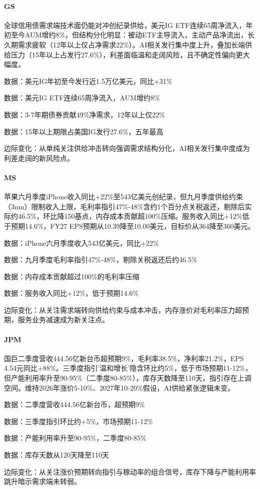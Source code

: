 \documentclass[11pt]{ctexart}
\begin{document}
\paragraph{GS} 全球信用债需求端技术面仍能对冲创纪录供给，美元IG ETF连续65周净流入，年初至今AUM增约8\%，但结构分化明显：被动ETF主导流入，主动产品净流出，长久期需求疲软（12年以上仅占净需求22\%）。AI相关发行集中度上升，叠加长端供给压力（15年以上占发行27.6\%），利差面临温和走阔风险，且不确定性偏向更大幅度。
{\small\color{refgray}数据：美元IG年初至今发行近1.5万亿美元，同比+31\%\par}
{\small\color{refgray}数据：美元IG ETF连续65周净流入，AUM增约8\%\par}
{\small\color{refgray}数据：3-7年期债券贡献49\%净需求，12年以上仅22\%\par}
{\small\color{refgray}数据：15年以上期限占美国IG发行27.6\%，五年最高\par}
{\small\color{refgray}边际变化：从单纯关注供给冲击转向强调需求结构分化，AI相关发行集中度成为利差走阔的新风险点。\par}
\paragraph{MS} 苹果六月季度iPhone收入同比+22\%至543亿美元创纪录，但九月季度供给约束（3nm）限制收入上限，毛利率指引47\%-48\%含约1个百分点关税返还，剔除后实际约46.5\%，环比降150基点，内存成本贡献超100\%压缩。服务收入同比+12\%低于预期14.6\%，FY27 EPS预期从10.39降至10.00美元，目标价从364降至360美元。
{\small\color{refgray}数据：iPhone六月季度收入543亿美元，同比+22\%\par}
{\small\color{refgray}数据：九月季度毛利率指引47\%-48\%，剔除关税返还后约46.5\%\par}
{\small\color{refgray}数据：内存成本贡献超过100\%的毛利率压缩\par}
{\small\color{refgray}数据：服务收入同比+12\%，低于预期14.6\%\par}
{\small\color{refgray}边际变化：从关注需求端转向供给约束与成本冲击，内存涨价对毛利率压力超预期，服务业务减速成为新关注点。\par}
\paragraph{JPM} 国巨二季度营收444.56亿新台币超预期9\%，毛利率38.5\%，净利率21.2\%，EPS 4.54元同比+88\%。三季度指引'温和增长'隐含环比约5\%，低于市场预期11-12\%，但产能利用率升至90-95\%（二季度80-85\%），库存天数降至110天，指引存在上调空间。维持2026年涨价5-10\%、2027年10-20\%假设，AI供给紧张逻辑未变。
{\small\color{refgray}数据：二季度营收444.56亿新台币，超预期9\%\par}
{\small\color{refgray}数据：三季度指引环比约+5\%，市场预期11-12\%\par}
{\small\color{refgray}数据：产能利用率升至90-95\%，二季度80-85\%\par}
{\small\color{refgray}数据：库存天数从120天降至110天\par}
{\small\color{refgray}边际变化：从关注涨价预期转向指引与稼动率的组合信号，库存下降与产能利用率跳升暗示需求端未转弱。\par}
\end{document}
